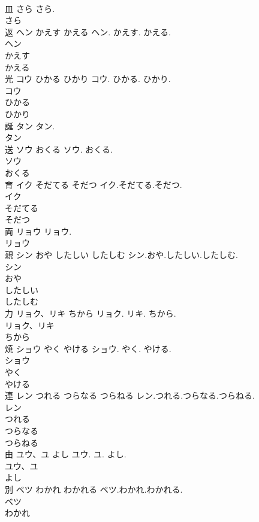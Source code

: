 \documentclass[8pt]{extreport}
\begin{document}
\begin{CJK}{UTF8}{min}
\\	皿	さら	さら.	
\\	さら
\\	返	ヘン かえす かえる	ヘン. かえす. かえる.	
\\	ヘン
\\	かえす
\\	かえる
\\	光	コウ ひかる ひかり	コウ. ひかる. ひかり.	
\\	コウ
\\	ひかる
\\	ひかり
\\	誕	タン	タン.	
\\	タン
\\	送	ソウ おくる	ソウ. おくる.	
\\	ソウ
\\	おくる
\\	育	イク そだてる そだつ	イク.そだてる.そだつ.	
\\	イク
\\	そだてる
\\	そだつ
\\	両	リョウ	リョウ.	
\\	リョウ
\\	親	シン おや したしい したしむ	シン.おや.したしい.したしむ.	
\\	シン
\\	おや
\\	したしい
\\	したしむ
\\	力	リョク、リキ ちから	リョク. リキ. ちから.	
\\	リョク、リキ
\\	ちから
\\	焼	ショウ やく やける	ショウ. やく. やける.	
\\	ショウ
\\	やく
\\	やける
\\	連	レン つれる つらなる つらねる	レン.つれる.つらなる.つらねる.	
\\	レン
\\	つれる
\\	つらなる
\\	つらねる
\\	由	ユウ、ユ よし	ユウ. ユ. よし.	
\\	ユウ、ユ
\\	よし
\\	別	ベツ わかれ わかれる	ベツ.わかれ.わかれる.	
\\	ベツ
\\	わかれ

\end{CJK}
\end{document}
